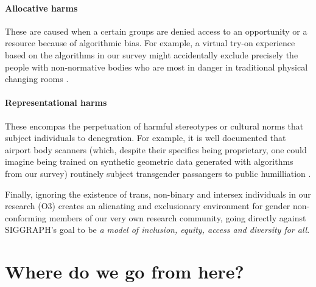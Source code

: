 \documentclass[nonacm,sigconf,review,balance=false]{acmart}
\begin{document}
\paragraph{Allocative harms} These are caused when a certain groups are denied access to an opportunity or a resource because of algorithmic bias. For example, a virtual try-on experience based on the algorithms in our survey might accidentally exclude precisely the people with non-normative bodies who are most in danger in traditional physical changing rooms \cite{changingroom}.

\paragraph*{Representational harms} These encompas the perpetuation of harmful stereotypes or cultural norms that subject individuals to denegration. For example, it is well documented that airport body scanners (which, despite their specifics being proprietary, one could imagine being trained on synthetic geometric data generated with algorithms from our survey) routinely subject transgender passangers to public humilliation \cite{tsa}.

Finally, ignoring the existence of trans, non-binary and intersex individuals in our research (O3) creates an alienating and exclusionary environment for gender non-conforming members of our very own research community, going directly against SIGGRAPH's goal to be \emph{a model of inclusion, equity, access and diversity for all}.

\section{Where do we go from here?}
\end{document}

